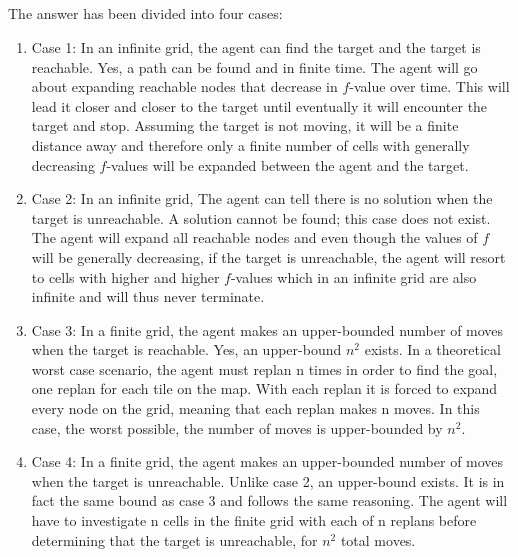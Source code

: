 \documentclass[a4paper,12pt]{article}
\begin{document}
\subsection{}
The answer has been divided into four cases:
\begin{enumerate}
	\item Case 1: In an infinite grid, the agent can find the target and the target is reachable. Yes, a path can be found and in finite time. 
		\newline The agent will go about expanding reachable nodes that decrease in $f$-value over time. This will lead it closer and closer to the target until eventually it will encounter the target and stop. Assuming the target is not moving, it will be a finite distance away and therefore only a finite number of cells with generally decreasing $f$-values will be expanded between the agent and the target. 		
		
	\item Case 2: In an infinite grid, The agent can tell there is no solution when the target is unreachable. A solution cannot be found; this case does not exist.
		\newline The agent will expand all reachable nodes and even though the values of $f$ will be generally decreasing, if the target is unreachable, the agent will resort to cells with higher and higher $f$-values which in an infinite grid are also infinite and will thus never terminate. 
		
	\item Case 3: In a finite grid, the agent makes an upper-bounded number of moves when the target is reachable. Yes, an upper-bound $n^2$ exists.
        		\newline In a theoretical worst case scenario, the agent must replan n times in order to find the goal, one replan for each tile on the map. With each replan it is forced to expand every node on the grid, meaning that each replan makes n moves. In this case, the worst possible, the number of moves is upper-bounded by $n^2$.

   	\item Case 4: In a finite grid, the agent makes an upper-bounded number of moves when the target is unreachable. Unlike case 2, an upper-bound exists. 
        		\newline It is in fact the same bound as case 3 and follows the same reasoning. The agent will have to investigate n cells in the finite grid with each of n replans before determining that the target is unreachable, for $n^2$ total moves.
		
\end{enumerate}
\end{document}

